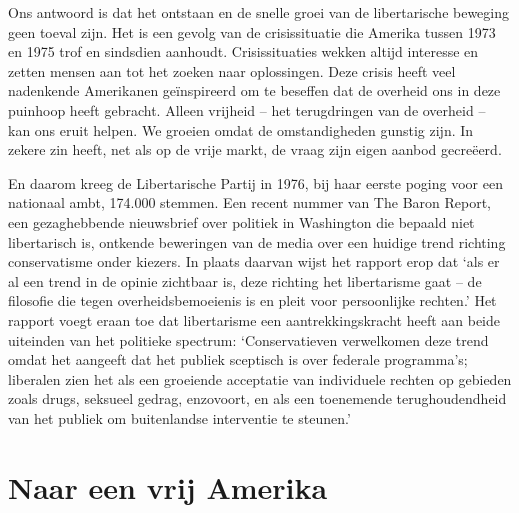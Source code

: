 \documentclass[
  a5paper,
  smalldemyvopaper,10pt,twoside,onecolumn,openright,extrafontsizes,hidelinks]{memoir}
\begin{document}
Ons antwoord is dat het ontstaan en de snelle groei van de libertarische
beweging geen toeval zijn. Het is een gevolg van de crisissituatie die
Amerika tussen 1973 en 1975 trof en sindsdien aanhoudt. Crisissituaties
wekken altijd interesse en zetten mensen aan tot het zoeken naar
oplossingen. Deze crisis heeft veel nadenkende Amerikanen geïnspireerd
om te beseffen dat de overheid ons in deze puinhoop heeft gebracht.
Alleen vrijheid -- het terugdringen van de overheid -- kan ons eruit
helpen. We groeien omdat de omstandigheden gunstig zijn. In zekere zin
heeft, net als op de vrije markt, de vraag zijn eigen aanbod gecreëerd.

En daarom kreeg de Libertarische Partij in 1976, bij haar eerste poging
voor een nationaal ambt, 174.000 stemmen. Een recent nummer van The
Baron Report, een gezaghebbende nieuwsbrief over politiek in Washington
die bepaald niet libertarisch is, ontkende beweringen van de media over
een huidige trend richting conservatisme onder kiezers. In plaats
daarvan wijst het rapport erop dat `als er al een trend in de opinie
zichtbaar is, deze richting het libertarisme gaat -- de filosofie die
tegen overheidsbemoeienis is en pleit voor persoonlijke rechten.' Het
rapport voegt eraan toe dat libertarisme een aantrekkingskracht heeft
aan beide uiteinden van het politieke spectrum: `Conservatieven
verwelkomen deze trend omdat het aangeeft dat het publiek sceptisch is
over federale programma's; liberalen zien het als een groeiende
acceptatie van individuele rechten op gebieden zoals drugs, seksueel
gedrag, enzovoort, en als een toenemende terughoudendheid van het
publiek om buitenlandse interventie te steunen.'

\section{Naar een vrij Amerika}\label{naar-een-vrij-amerika}
\end{document}
